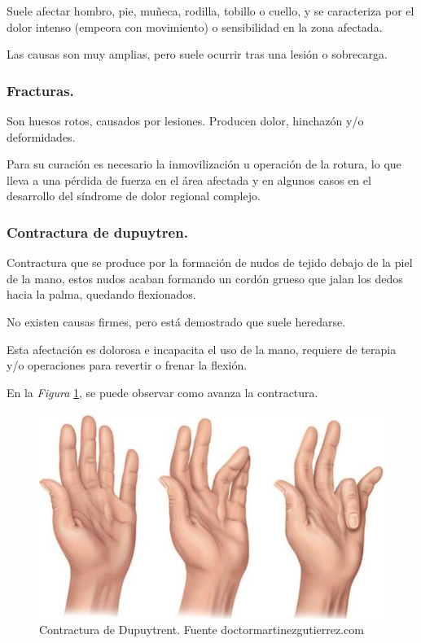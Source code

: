 Suele afectar hombro, pie, muñeca, rodilla, tobillo o cuello, y se caracteriza por el dolor intenso (empeora con movimiento) o sensibilidad en la zona afectada. \cite{tendinitis}

Las causas son muy amplias, pero suele ocurrir tras una lesión o sobrecarga.\cite{tendinitis-1}
\subsubsection{Fracturas.}

Son huesos rotos, causados por lesiones. Producen dolor, hinchazón y/o deformidades.

Para su curación es necesario la inmovilización u operación de la rotura, lo que lleva a una pérdida de fuerza en el área afectada y en algunos casos en el desarrollo del síndrome de dolor regional complejo.\cite{fracturas}
\subsubsection{Contractura de dupuytren.}
Contractura que se produce por la formación de nudos de tejido debajo de la piel de la mano, estos nudos acaban formando un cordón grueso que jalan los dedos hacia la palma, quedando flexionados.  \cite{contractura_Dupuytren-1}

No existen causas firmes, pero está demostrado que suele heredarse. 

Esta afectación es dolorosa e incapacita el uso de la mano, requiere de terapia y/o operaciones para revertir o frenar la flexión. \cite{contractura_Dupuytren-1}

En la \textit{Figura} \ref{fig:Dupuytrent}, se puede observar como avanza la contractura.

\begin{figure}
    \centering
    \includegraphics[width=0.5\linewidth]{img/Dupuytrent.png}
    \caption{Contractura de Dupuytrent. Fuente doctormartinezgutierrez.com}
    \label{fig:Dupuytrent}
\end{figure}

